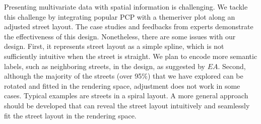 Presenting multivariate data with spatial information is challenging.
We tackle this challenge by integrating popular PCP with a themeriver plot along an adjusted street layout.
The case studies and feedbacks from experts demonstrate the effectiveness of this design.
Nonetheless, there are some issues with our design.
First, it represents street layout as a simple spline, which is not sufficiently intuitive when the street is straight.
We plan to encode more semantic labels, such as neighboring streets, in the design, as suggested by $EA$.
Second, although the majority of the streets (over 95\%) that we have explored can be rotated and fitted in the rendering space, adjustment does not work in some cases.
Typical examples are streets in a spiral layout.
A more general approach should be developed that can reveal the street layout intuitively and seamlessly fit the street layout in the rendering space.
